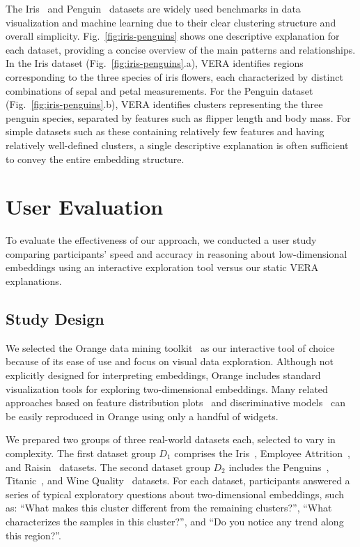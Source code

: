 \documentclass[lettersize,journal]{IEEEtran}
\begin{document}
The Iris~\cite{Anderson1936} and Penguin~\cite{Horst2020} datasets are widely used benchmarks in data visualization and machine learning due to their clear clustering structure and overall simplicity.
Fig.~\ref{fig:iris-penguins} shows one descriptive explanation for each dataset, providing a concise overview of the main patterns and relationships.
In the Iris dataset (Fig.~\ref{fig:iris-penguins}.a), VERA identifies regions corresponding to the three species of iris flowers, each characterized by distinct combinations of sepal and petal measurements. For the Penguin dataset (Fig.~\ref{fig:iris-penguins}.b), VERA identifies clusters representing the three penguin species, separated by features such as flipper length and body mass.
For simple datasets such as these containing relatively few features and having relatively well-defined clusters, a single descriptive explanation is often sufficient to convey the entire embedding structure.


\section{User Evaluation}
\label{sec:user-study}

To evaluate the effectiveness of our approach, we conducted a user study comparing participants’ speed and accuracy in reasoning about low-dimensional embeddings using an interactive exploration tool versus our static VERA explanations.

\subsection{Study Design}

We selected the Orange data mining toolkit~\cite{Demsar2013} as our interactive tool of choice because of its ease of use and focus on visual data exploration.
Although not explicitly designed for interpreting embeddings, Orange includes standard visualization tools for exploring two-dimensional embeddings. Many related approaches based on feature distribution plots~\cite{Stahnke2016,Eckelt2022} and discriminative models~\cite{Bibal2021,Marcilio2021} can be easily reproduced in Orange using only a handful of widgets.

We prepared two groups of three real-world datasets each, selected to vary in complexity.
The first dataset group $D_1$ comprises the Iris~\cite{Anderson1936}, Employee Attrition~\cite{IbmEmployeeAttrition}, and Raisin~\cite{RaisinDataset} datasets. The second dataset group $D_2$ includes the Penguins~\cite{Horst2020}, Titanic~\cite{Dawson1995}, and Wine Quality~\cite{Cortez2009} datasets. For each dataset, participants answered a series of typical exploratory questions about two-dimensional embeddings, such as: ``What makes this cluster different from the remaining clusters?'', ``What characterizes the samples in this cluster?'', and ``Do you notice any trend along this region?''.
\end{document}
